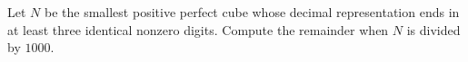 Let $N$ be the smallest positive perfect cube whose decimal representation ends in at least three identical nonzero digits. Compute the remainder when $N$ is divided by $1000$.
